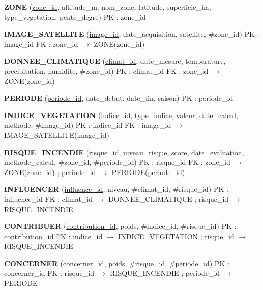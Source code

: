 \documentclass[12pt,a4paper]{report}
\begin{document}
\vspace{0.3cm}
\begin{statusbox}
\textbf{ZONE} (\underline{zone\_id}, altitude\_m, nom\_zone, latitude, superficie\_ha, type\_vegetation, pente\_degre)
\quad PK : zone\_id

\vspace{0.4cm}
\textbf{IMAGE\_SATELLITE} (\underline{image\_id}, date\_acquisition, satellite, \#zone\_id)
\quad PK : image\_id \quad FK : zone\_id $\rightarrow$ ZONE(zone\_id)

\vspace{0.4cm}
\textbf{DONNEE\_CLIMATIQUE} (\underline{climat\_id}, date\_mesure, temperature, precipitation, humidite, \#zone\_id)
\quad PK : climat\_id \quad FK : zone\_id $\rightarrow$ ZONE(zone\_id)

\vspace{0.4cm}
\textbf{PERIODE} (\underline{periode\_id}, date\_debut, date\_fin, saison)
\quad PK : periode\_id

\vspace{0.4cm}
\textbf{INDICE\_VEGETATION} (\underline{indice\_id}, type\_indice, valeur, date\_calcul, methode, \#image\_id)
\quad PK : indice\_id \quad FK : image\_id $\rightarrow$ IMAGE\_SATELLITE(image\_id)

\vspace{0.4cm}
\textbf{RISQUE\_INCENDIE} (\underline{risque\_id}, niveau\_risque, score, date\_evaluation, methode\_calcul, \#zone\_id, \#periode\_id)
\quad PK : risque\_id \quad FK : zone\_id $\rightarrow$ ZONE(zone\_id) ; periode\_id $\rightarrow$ PERIODE(periode\_id)

\vspace{0.4cm}
\textbf{INFLUENCER} (\underline{influence\_id}, niveau, \#climat\_id, \#risque\_id)
\quad PK : influence\_id \quad FK : climat\_id $\rightarrow$ DONNEE\_CLIMATIQUE ; risque\_id $\rightarrow$ RISQUE\_INCENDIE

\vspace{0.4cm}
\textbf{CONTRIBUER} (\underline{contribution\_id}, poids, \#indice\_id, \#risque\_id)
\quad PK : contribution\_id \quad FK : indice\_id $\rightarrow$ INDICE\_VEGETATION ; risque\_id $\rightarrow$ RISQUE\_INCENDIE

\vspace{0.4cm}
\textbf{CONCERNER} (\underline{concerner\_id}, poids, \#risque\_id, \#periode\_id)
\quad PK : concerner\_id \quad FK : risque\_id $\rightarrow$ RISQUE\_INCENDIE ; periode\_id $\rightarrow$ PERIODE
\end{statusbox}
\end{document}
